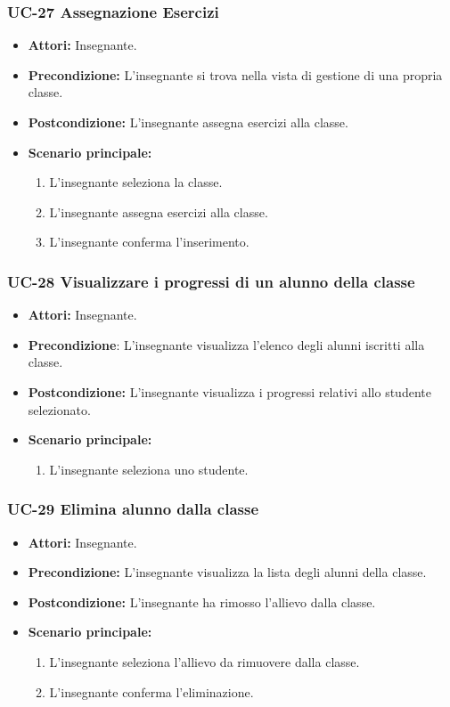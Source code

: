 \subsubsection{UC-27 Assegnazione Esercizi}
\begin{itemize}
	\item \textbf{Attori:} Insegnante.
	\item \textbf{Precondizione:} L'insegnante si trova nella vista di gestione di una propria classe.
	\item \textbf{Postcondizione:} L'insegnante assegna esercizi alla classe.
	\item \textbf{Scenario principale:}
	\begin{enumerate}
		\item L'insegnante seleziona la classe.
		\item L'insegnante assegna esercizi alla classe.
		\item L'insegnante conferma l'inserimento.
	\end{enumerate}
\end{itemize}



\subsubsection{UC-28 Visualizzare i progressi di un alunno della classe}
\begin{itemize}
	\item \textbf{Attori:} Insegnante.
	\item \textbf{Precondizione}: L'insegnante visualizza l'elenco degli alunni iscritti alla classe.
	\item \textbf{Postcondizione:} L'insegnante visualizza i progressi relativi allo studente selezionato.
	\item \textbf{Scenario principale:}
	\begin{enumerate}
		\item L'insegnante seleziona uno studente. 
	\end{enumerate}
\end{itemize}

\subsubsection{UC-29 Elimina alunno dalla classe}		
\begin{itemize}
	\item \textbf{Attori:} Insegnante.
	\item \textbf{Precondizione:} L'insegnante visualizza la lista degli alunni della classe.
	\item \textbf{Postcondizione:} L'insegnante ha rimosso l'allievo dalla classe.
	\item \textbf{Scenario principale:}
	\begin{enumerate}
		\item L'insegnante seleziona l'allievo da rimuovere dalla classe.
		\item L'insegnante conferma l'eliminazione.
	\end{enumerate}	
\end{itemize}


